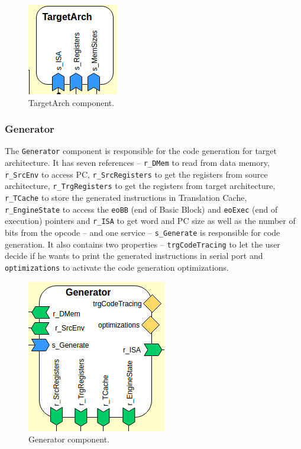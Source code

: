 \documentclass{report}
\begin{document}
			\begin{figure} [H]
				\centering
				\includegraphics[width=0.25\linewidth]{Images/arch-ref/TargetArch}
				\caption{TargetArch component.}
				\label{fig:TargetArch}
			\end{figure}
		
			\subsubsection{Generator}
			
			\par The \texttt{Generator} component is responsible for the code generation for target architecture. It has seven references -- \texttt{r\_DMem} to read from data memory, \texttt{r\_SrcEnv} to access PC, \texttt{r\_SrcRegisters} to get the registers from source architecture, \texttt{r\_TrgRegisters} to get the registers from target architecture, \texttt{r\_TCache} to store the generated instructions in Translation Cache, \texttt{r\_EngineState} to access the \texttt{eoBB} (end of Basic Block) and \texttt{eoExec} (end of execution) pointers and \texttt{r\_ISA} to get word and PC size as well as the number of bits from the opcode -- and one service -- \texttt{s\_Generate} is responsible for code generation. It also contains two properties -- \texttt{trgCodeTracing} to let the user decide if he wants to print the generated instructions in serial port and \texttt{optimizations} to activate the code generation optimizations.  
			
			\begin{figure} [H]
				\centering
				\includegraphics[width=0.35\linewidth]{Images/arch-ref/Generator}
				\caption{Generator component.}
				\label{fig:Generator}
			\end{figure}
			
\end{document}
